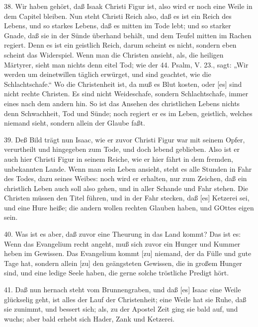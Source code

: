 38. Wir haben gehört, daß Isaak Christi
Figur ist, also wird er noch eine Weile in dem Capitel bleiben. Nun steht Christi Reich also, daß es ist ein Reich des Lebens, und so starkes Lebens, daß es mitten im Tode lebt; und so starker Gnade, daß sie in der Sünde überhand behält, und dem Teufel mitten im Rachen regiert. Denn es ist ein geistlich Reich, darum scheint es nicht, sondern eben scheint das Widerspiel. Wenn man die Christen ansieht, als, die heiligen Märtyrer, sieht man nichts denn eitel Tod; wie der 44. Psalm, V. 23., sagt: „Wir werden um deinetwillen täglich erwürget, und sind geachtet, wie die Schlachtschafe.“ Wo die Christenheit ist, da muß es Blut kosten, oder [es] sind nicht rechte Christen. Es sind nicht Weideschafe, sondern Schlachtschafe, immer eines nach dem andern hin. So ist das Ansehen des christlichen Lebens nichts denn Schwachheit, Tod und Sünde; noch regiert er es im Leben, geistlich, welches niemand sieht, sondern allein der Glaube faßt.

39. Deß Bild trägt nun Isaac, wie er zuvor Christi Figur war mit seinem Opfer, verurtheilt und hingegeben zum Tode, und doch lebend geblieben. Also ist er auch hier Christi Figur in seinem Reiche, wie er hier fährt in dem fremden, unbekannten Lande. Wenn man sein Leben ansieht, steht es alle Stunden in Fahr des Todes, dazu seines Weibes: noch wird er erhalten, nur zum Zeichen, daß ein christlich Leben auch soll also gehen, und in aller Schande und Fahr stehen. Die Christen müssen den Titel führen, und in der Fahr stecken, daß [es] Ketzerei sei, und eine Hure heiße; die andern wollen rechten Glauben haben, und GOttes eigen sein.

40. Was ist es aber, daß zuvor eine Theurung in das Land kommt? Das ist es: Wenn das Evangelium recht angeht, muß sich zuvor ein Hunger und Kummer heben im Gewissen. Das Evangelium kommt [zu] niemand, der da Fülle und gute Tage hat, sondern allein [zu] den geängsteten Gewissen, die in großem Hunger sind, und eine ledige Seele haben, die gerne solche tröstliche Predigt hört.

41. Daß nun hernach steht vom Brunnengraben, und daß [es] Isaac eine Weile glückselig geht, ist alles der Lauf der Christenheit; eine Weile hat sie Ruhe, daß sie zunimmt, und bessert sich; als, zu der Apostel Zeit ging sie bald auf, und wuchs; aber bald erhebt sich Hader, Zank und Ketzerei.


